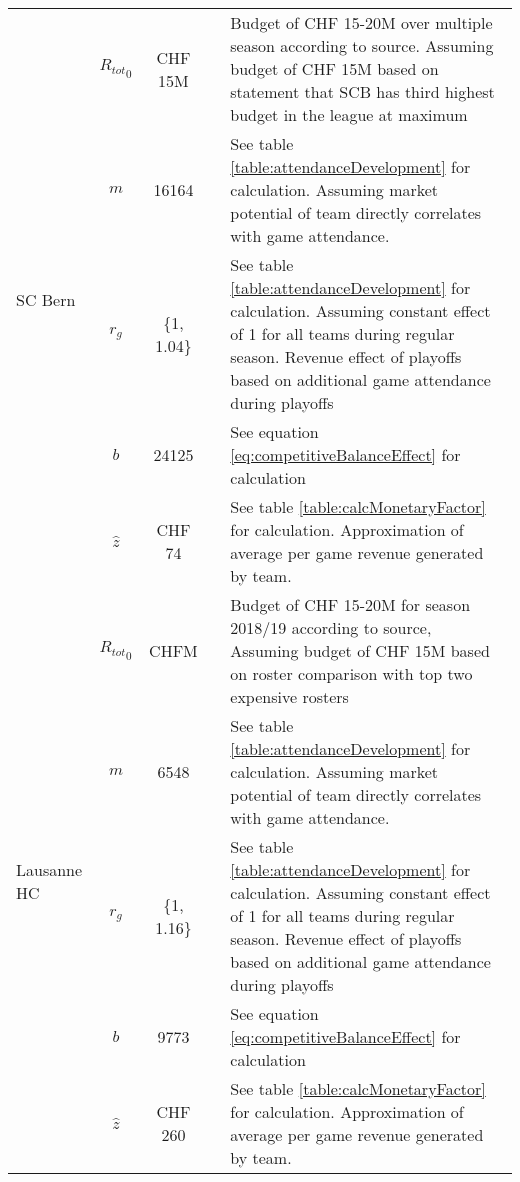 \begin{longtable}[h!]{p{1.5cm}cc>{\baselineskip=13pt}p{3cm}>{\baselineskip=13pt}p{5.5cm}}
    \multirow[t]{5}{=}{SC Bern} & ${R_{tot}}_{0}$ & CHF 15M & \cite{zaugg_seit_2017} & 
    Budget of CHF 15-20M over multiple season according to source. Assuming budget of CHF 15M based on statement that SCB has third highest budget in the league at maximum \citep{luthi_es_2020}\\
                                                 & $m$ & 16164 & \cite{national_league_zuschauerzahlen_2022} & See table \ref{table:attendanceDevelopment} for calculation. Assuming market potential of team directly correlates with game attendance. \\
                                                 & $r_g$ & \{1, 1.04\} & \cite{national_league_zuschauerzahlen_2022} & See table \ref{table:attendanceDevelopment} for calculation. Assuming constant effect of 1 for all teams during regular season. Revenue effect of playoffs based on additional game attendance during playoffs \\
                                                 & $b$ & 24125 &  & See equation \ref{eq:competitiveBalanceEffect} for calculation \\
                                                 & $\hat{z}$ & CHF 74 &  & See table \ref{table:calcMonetaryFactor} for calculation. Approximation of average per game revenue generated by team. \\
    \midrule
    
    \multirow[t]{5}{=}{Lausanne HC} & ${R_{tot}}_{0}$ & CHFM & \cite{reynard_au_2018} & 
    Budget of CHF 15-20M for season 2018/19 according to source, Assuming budget of CHF 15M based on roster comparison with top two expensive rosters\\
                                   & $m$ & 6548 & \cite{national_league_zuschauerzahlen_2022} & See table \ref{table:attendanceDevelopment} for calculation. Assuming market potential of team directly correlates with game attendance. \\
                                   & $r_g$ & \{1, 1.16\} & \cite{national_league_zuschauerzahlen_2022} & See table \ref{table:attendanceDevelopment} for calculation. Assuming constant effect of 1 for all teams during regular season. Revenue effect of playoffs based on additional game attendance during playoffs \\
                                   & $b$ & 9773 &  & See equation \ref{eq:competitiveBalanceEffect} for calculation \\
                                   & $\hat{z}$ & CHF 260 &  & See table \ref{table:calcMonetaryFactor} for calculation. Approximation of average per game revenue generated by team. \\
    \midrule
    

\end{longtable}
